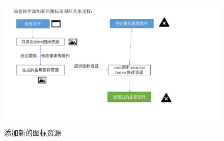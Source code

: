 \begin{figure}
  \centering
  \includegraphics[]{images/add_resources.png}
  \caption{添加新的图标资源}\label{fig:add_resources}
\end{figure}